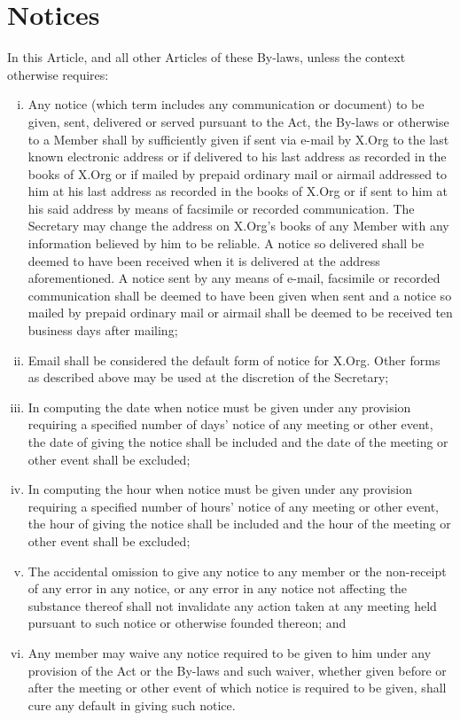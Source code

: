 \documentclass[10pt, english]{bylaws}
\begin{document}
\section{Notices}
In this Article, and all other Articles of these By-laws, unless the context
otherwise requires:

\begin{enumerate}[(i)\hspace{.2cm}]
	\item Any notice (which term includes any communication or document) to
	be given, sent, delivered or served pursuant to the Act, the By-laws or
	otherwise to a Member shall by sufficiently given if sent via e-mail by
	X.Org to the last known electronic address or if delivered to his last
	address as recorded in the books of X.Org or if mailed by prepaid
	ordinary mail or airmail addressed to him at his last address as
	recorded in the books of X.Org or if sent to him at his said address by
	means of facsimile or recorded communication. The Secretary may change
	the address on X.Org's books of any Member with any information believed
	by him to be reliable. A notice so delivered shall be deemed to have
	been received when it is delivered at the address aforementioned. A notice
	sent by any means of e-mail, facsimile or recorded communication shall
	be deemed to have been given when sent and a notice so mailed by
	prepaid ordinary mail or airmail shall be deemed to be received ten
	business days after mailing;

	\item Email shall be considered the default form of notice for X.Org.
	Other forms as described above may be used at the discretion of the
	Secretary;

	\item In computing the date when notice must be given under any
	provision requiring a specified number of days' notice of any meeting or
	other event, the date of giving the notice shall be included and the
	date of the meeting or other event shall be excluded;

	\item In computing the hour when notice must be given under any
	provision requiring a specified number of hours' notice of any meeting
	or other event, the hour of giving the notice shall be included and the
	hour of the meeting or other event shall be excluded;

	\item The accidental omission to give any notice to any member or the
	non-receipt of any error in any notice, or any error in any notice not
	affecting the substance thereof shall not invalidate any action taken at
	any meeting held pursuant to such notice or otherwise founded thereon;
	and

	\item Any member may waive any notice required to be given to him under
	any provision of the Act or the By-laws and such waiver, whether given
	before or after the meeting or other event of which notice is required
	to be given, shall cure any default in giving such notice.
\end{enumerate}
\end{document}
